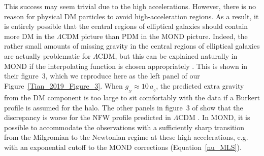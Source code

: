 \documentclass[fleqn,usenatbib,useAMS,onecolumn]{mnras} %
\begin{document}
This success may seem trivial due to the high accelerations. However, there is no reason for physical DM particles to avoid high-acceleration regions. As a result, it is entirely possible that the central regions of elliptical galaxies should contain more DM in the $\Lambda$CDM picture than PDM in the MOND picture. Indeed, the rather small amounts of missing gravity in the central regions of elliptical galaxies are actually problematic for $\Lambda$CDM, but this can be explained naturally in MOND if the interpolating function is chosen appropriately \citep{Tian_2019}. This is shown in their figure~3, which we reproduce here as the left panel of our Figure~\ref{Tian_2019_Figure_3}. When $g_{_N} \approx 10 \, a_{_0}$, the predicted extra gravity from the DM component is too large to sit comfortably with the data if a Burkert profile is assumed for the halo. The other panels in figure~3 of \citet{Tian_2019} show that the discrepancy is worse for the NFW profile predicted in $\Lambda$CDM \citep{Navarro_1997}. In MOND, it is possible to accommodate the observations with a sufficiently sharp transition from the Milgromian to the Newtonian regime at these high accelerations, e.g. with an exponential cutoff to the MOND corrections (Equation~\ref{nu_MLS}).
\end{document}
